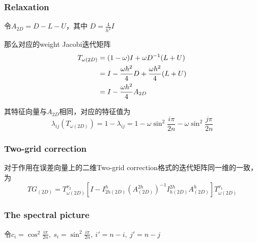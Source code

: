 \documentclass{article}
\begin{document}
\subsubsection{Relaxation}
令$A_{2D} = D-L-U$，其中 $D = \frac{4}{h^2}I$

那么对应的weight Jacobi迭代矩阵
\begin{align}
    T_{\omega(2D)} &=(1-\omega)I+\omega D^{-1}(L+U) \notag \\
    & = I - \frac{\omega h^2}{4}D + \frac{\omega h^2}{4}(L+U) \notag \\
    & = I - \frac{\omega h^2}{4}A_{2D} \notag
\end{align}

其特征向量与$A_{2D}$相同，对应的特征值为$$\lambda_{ij}(T_{\omega (2D)})=1-\lambda_{ij}= 1 - \omega\sin^2\frac{i\pi}{2n} -\omega\sin^2\frac{j\pi}{2n}$$

\subsubsection{Two-grid correction}
对于作用在误差向量上的二维Two-grid correction格式的迭代矩阵同一维的一致，为
$$TG_{(2D)}= T_{\omega(2D)}^{\nu_2}[I-I_{2h(2D)}^h(A_{(2D)}^{2h})^{-1}I_{h(2D)}^{2h}A_{(2D)}^h]T_{\omega(2D)}^{\nu_1}$$

\subsubsection{The spectral picture}
令$c_i = \cos^2\frac{i\pi}{2n},\ s_i = \sin^2\frac{i\pi}{2n},\ i'=n-i,\ j'=n-j$
\end{document}
